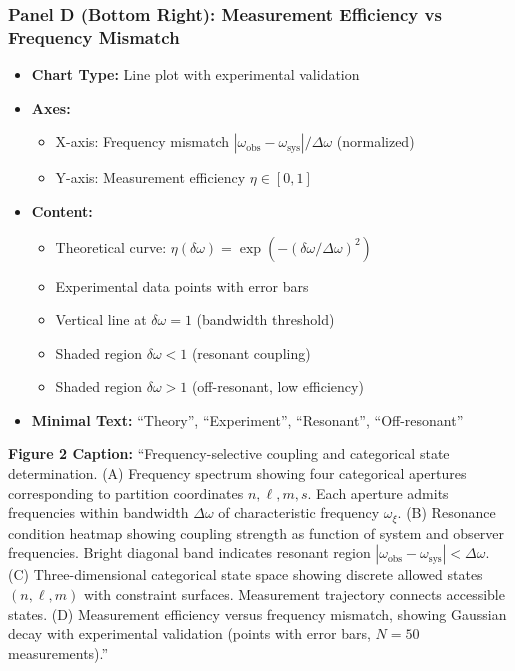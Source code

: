 \subsubsection*{Panel D (Bottom Right): Measurement Efficiency vs Frequency Mismatch}
\begin{itemize}
\item \textbf{Chart Type:} Line plot with experimental validation
\item \textbf{Axes:}
  \begin{itemize}
  \item X-axis: Frequency mismatch $|\omega_{\text{obs}} - \omega_{\text{sys}}|/\Delta\omega$ (normalized)
  \item Y-axis: Measurement efficiency $\eta \in [0,1]$
  \end{itemize}
\item \textbf{Content:}
  \begin{itemize}
  \item Theoretical curve: $\eta(\delta\omega) = \exp(-(\delta\omega/\Delta\omega)^2)$
  \item Experimental data points with error bars
  \item Vertical line at $\delta\omega = 1$ (bandwidth threshold)
  \item Shaded region $\delta\omega < 1$ (resonant coupling)
  \item Shaded region $\delta\omega > 1$ (off-resonant, low efficiency)
  \end{itemize}
\item \textbf{Minimal Text:} ``Theory'', ``Experiment'', ``Resonant'', ``Off-resonant''
\end{itemize}

\textbf{Figure 2 Caption:}
``Frequency-selective coupling and categorical state determination. (A) Frequency spectrum showing four categorical apertures corresponding to partition coordinates $n,\ell,m,s$. Each aperture admits frequencies within bandwidth $\Delta\omega$ of characteristic frequency $\omega_\xi$. (B) Resonance condition heatmap showing coupling strength as function of system and observer frequencies. Bright diagonal band indicates resonant region $|\omega_{\text{obs}}-\omega_{\text{sys}}|<\Delta\omega$. (C) Three-dimensional categorical state space showing discrete allowed states $(n,\ell,m)$ with constraint surfaces. Measurement trajectory connects accessible states. (D) Measurement efficiency versus frequency mismatch, showing Gaussian decay with experimental validation (points with error bars, $N=50$ measurements).''

